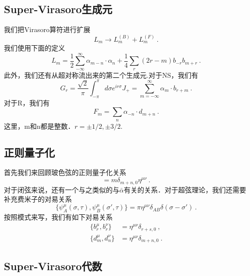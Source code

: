 \subsection{Super-Virasoro生成元}
我们把Virasoro算符进行扩展
\begin{equation}
L_m \rightarrow L_m^{(B)} + L_m^{(F)}~.
\end{equation}
我们使用下面的定义
\begin{equation}
L_m = \frac{1}{2} \sum_{-\infty}^{\infty} \alpha_{m-n} \cdot \alpha_n + \frac{1}{4} \sum_r (2r-m) b_{-r} b_{m+r}~.
\end{equation}
此外，我们还有从超对称流出来的第二个生成元.对于NS，我们有
\begin{equation}
G_r = \frac{\sqrt{2}}{\pi} \int_{-\pi}^{\pi} d\sigma e^{ir\sigma} J_+ = \sum_{m=-\infty}^{\infty} \alpha_m \cdot b_{r+m}~.
\end{equation}
对于R，我们有
\begin{equation}
F_m = \sum_n \alpha_{-n} \cdot d_{m+n}~.
\end{equation}
这里，m和n都是整数．$r=\pm 1/2,\pm 3/2$.

\subsection{正则量子化}
首先我们来回顾玻色弦的正则量子化关系
\begin{equation}
[\alpha^\mu_m,\alpha^\nu_n] = m \delta_{m+n,0} \eta^{\mu\nu}~.
\end{equation}
对于闭弦来说，还有一个与之类似的与$\bar\alpha$有关的关系．对于超弦理论，我们还需要补充费米子的对易关系
\begin{equation}
\{\psi^\mu_A(\sigma,\tau),\psi^\mu_B(\sigma',\tau) \} = \pi \eta^{\mu\nu} \delta_{AB} \delta(\sigma - \sigma')~.
\end{equation}
按照模式来写，我们有如下对易关系
\begin{equation}
\begin{aligned}
\{ b^\mu_r, b^\nu_r\} & = \eta^{\mu\nu} \delta_{r+s,0}~, \\
\{ d^\mu_m, d^\nu_n\} & = \eta^{\mu\nu} \delta_{m+n,0} ~.
\end{aligned}
\end{equation}

\subsection{Super-Virasoro代数}

